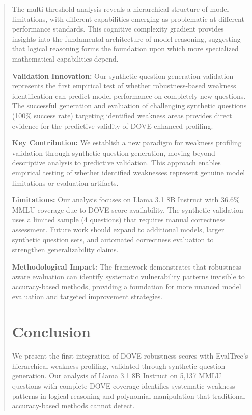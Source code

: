 \documentclass[11pt]{article}
\begin{document}
\begin{abstract}
The multi-threshold analysis reveals a hierarchical structure of model limitations, with different capabilities emerging as problematic at different performance standards. This cognitive complexity gradient provides insights into the fundamental architecture of model reasoning, suggesting that logical reasoning forms the foundation upon which more specialized mathematical capabilities depend.

\textbf{Validation Innovation:} Our synthetic question generation validation represents the first empirical test of whether robustness-based weakness identification can predict model performance on completely new questions. The successful generation and evaluation of challenging synthetic questions (100\% success rate) targeting identified weakness areas provides direct evidence for the predictive validity of DOVE-enhanced profiling.

\textbf{Key Contribution:} We establish a new paradigm for weakness profiling validation through synthetic question generation, moving beyond descriptive analysis to predictive validation. This approach enables empirical testing of whether identified weaknesses represent genuine model limitations or evaluation artifacts.

\textbf{Limitations:} Our analysis focuses on Llama 3.1 8B Instruct with 36.6\% MMLU coverage due to DOVE score availability. The synthetic validation uses a limited sample (4 questions) that requires manual correctness assessment. Future work should expand to additional models, larger synthetic question sets, and automated correctness evaluation to strengthen generalizability claims.

\textbf{Methodological Impact:} The framework demonstrates that robustness-aware evaluation can identify systematic vulnerability patterns invisible to accuracy-based methods, providing a foundation for more nuanced model evaluation and targeted improvement strategies.

\section{Conclusion}

We present the first integration of DOVE robustness scores with EvalTree's hierarchical weakness profiling, validated through synthetic question generation. Our analysis of Llama 3.1 8B Instruct on 5,137 MMLU questions with complete DOVE coverage identifies systematic weakness patterns in logical reasoning and polynomial manipulation that traditional accuracy-based methods cannot detect.


\end{abstract}
\end{document}
